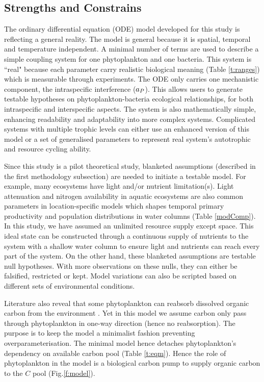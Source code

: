 \documentclass[../thesis.tex]{subfiles} %
\begin{document}
\subsection{Strengths and Constrains}
The ordinary differential equation (ODE) model developed for this study is reflecting a general reality.  The model is general because it is spatial, temporal and temperature independent.  A minimal number of terms are used to describe a simple coupling system for one phytoplankton and one bacteria.  This system is ``real" because each parameter carry realistic biological meaning (Table \ref{t:ranges}) which is measurable through experiments.  The ODE only carries one mechanistic component, the intraspecific interference ($a_P$).  This allows users to generate testable hypotheses on phytoplankton-bacteria ecological relationships, for both intraspecific and interspecific aspects.  The system is also mathematically simple, enhancing readability and adaptability into more complex systems.  Complicated systems with multiple trophic levels can either use an enhanced version of this model or a set of generalised parameters to represent real system's autotrophic and resource cycling ability.

Since this study is a pilot theoretical study, blanketed assumptions (described in the first methodology subsection) are needed to initiate a testable model.  For example, many ecosystems have light and/or nutrient limitation(s).  Light attenuation and nitrogen availability in aquatic ecosystems are also common parameters in location-specific models which shapes temporal primary productivity and population distributions in water columns (Table \ref{modComp}).  In this study, we have assumed an unlimited resource supply except space.  This ideal state can be constructed through a continuous supply of nutrients to the system with a shallow water column to ensure light and nutrients can reach every part of the system.  On the other hand, these blanketed assumptions are testable null hypotheses.  With more observations on these nulls, they can either be falsified, restricted or kept.  Model variations can also be scripted based on different sets of environmental conditions.

Literature also reveal that some phytoplankton can reabsorb dissolved organic carbon from the environment \autocite{j1989respiration,samejima1958heterotrophic}.  Yet in this model we assume carbon only pass through phytoplankton in one-way direction (hence no reabsorption).  The purpose is to keep the model a minimalist fashion preventing overparameterisation.  The minimal model hence detaches phytoplankton's dependency on available carbon pool (Table \ref{t:eqm}).  Hence the role of phytoplankton in the model is a biological carbon pump to supply organic carbon to the $C$ pool (Fig.\ref{f:model}).
\end{document}
